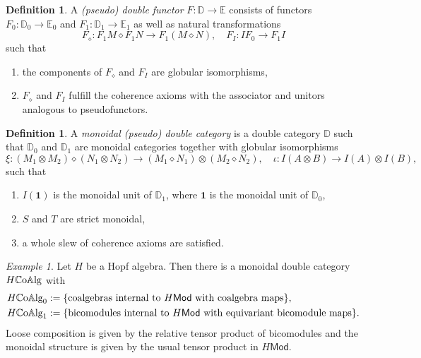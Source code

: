 \documentclass[11pt]{report}
\theoremstyle{definition}
\newtheorem{definition}[theorem]{Definition}
\theoremstyle{remark}
\theoremstyle{remark}
\newtheorem*{example}{Example}
\begin{document}
\begin{definition}
A \emph{(pseudo) double functor} $F: \mathbb{D} \to \mathbb{E}$ consists of functors $F_0: \mathbb{D}_0 \to \mathbb{E}_0$ and $F_1: \mathbb{D}_1 \to \mathbb{E}_1$ as well as natural transformations
\begin{equation*}
F_\diamond: F_1 M \diamond F_1 N \to F_1(M \diamond N), \quad F_I: I F_0 \to F_1 I
\end{equation*}
such that
\begin{enumerate}[label=(\roman*)]
\item the components of $F_\diamond$ and $F_I$ are globular isomorphisms,
\item $F_\diamond$ and $F_I$ fulfill the coherence axioms with the associator and unitors analogous to pseudofunctors.
\end{enumerate}
\end{definition}

\begin{definition}
A \emph{monoidal (pseudo) double category} is a double category $\mathbb{D}$ such that $\mathbb{D}_0$ and $\mathbb{D}_1$ are monoidal categories together with globular isomorphisms
\begin{equation*}
\xi: (M_1 \otimes M_2) \diamond (N_1 \otimes N_2) \to (M_1 \diamond N_1) \otimes (M_2 \diamond N_2), \quad \iota: I(A \otimes B) \to I(A) \otimes I(B),
\end{equation*}
such that
\begin{enumerate}[label=(\roman*)]
\item $I(\mathbf{1})$ is the monoidal unit of $\mathbb{D}_1$, where $\mathbf{1}$ is the monoidal unit of $\mathbb{D}_0$,
\item $S$ and $T$ are strict monoidal,
\item a whole slew of coherence axioms are satisfied.
\end{enumerate}
\end{definition}

\begin{example}
Let $H$ be a Hopf algebra. Then there is a monoidal double category $H\mathbb{C}\textnormal{o}\mathbb{A}\textnormal{lg}$ with
\begin{align*}
H\mathbb{C}\textnormal{o}\mathbb{A}\textnormal{lg}_0 &:= \{ \text{coalgebras internal to } H\mathsf{Mod} \text{ with coalgebra maps} \}, \\
H\mathbb{C}\textnormal{o}\mathbb{A}\textnormal{lg}_1 &:= \{ \text{bicomodules internal to } H\mathsf{Mod} \text{ with equivariant bicomodule maps} \}.
\end{align*}
Loose composition is given by the relative tensor product of bicomodules and the monoidal structure is given by the usual tensor product in $H\mathsf{Mod}$.
\end{example}
\end{document}
